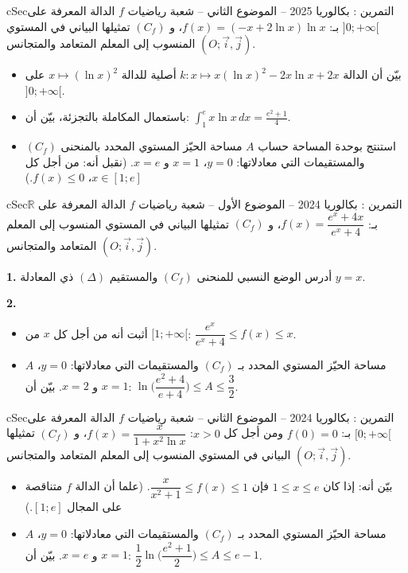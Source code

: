 \documentclass[12pt,a4paper]{article}
\newenvironment{BOX}[2]{\begin{otherlanguage}{english}\begin{arbox}{#1}{#2}}{\end{arbox}\end{otherlanguage}}
\newcounter{exo}
\newenvironment{tamrin}[1]{\stepcounter{exo}\begin{BOX}{cSec}{التمرين \theexo: #1}}{\end{BOX}}
\newcommand{\R}{\mathbb{R}}
\newenvironment{sq}{\begin{itemize}[leftmargin=2.4em,itemsep=3pt]}{\end{itemize}}
\newcommand{\qa}{\item[(أ)]}\newcommand{\qb}{\item[(ب)]}\newcommand{\qc}{\item[(جـ)]}\newcommand{\qd}{\item[(د)]}\newcommand{\qe}{\item[(هـ)]}
\newcommand{\QQ}[1]{\par\smallskip\textbf{#1.} }
\begin{document}
\begin{tamrin}{بكالوريا 2025 -- الموضوع الثاني -- شعبة رياضيات}
$f$ الدالة المعرفة على $]0;+\infty[$ بـ: $f(x)=(-x+2\ln x)\ln x$، و $(C_f)$ تمثيلها البياني في المستوي المنسوب إلى المعلم المتعامد والمتجانس $(O;\vec i,\vec j)$.
\begin{sq}
\qa بيّن أن الدالة $k:x\mapsto x(\ln x)^2-2x\ln x+2x$ أصلية للدالة $x\mapsto(\ln x)^2$ على $]0;+\infty[$.
\qb باستعمال المكاملة بالتجزئة، بيّن أن: $\displaystyle\int_1^ex\ln x\,dx=\frac{e^2+1}{4}$.
\qc استنتج بوحدة المساحة حساب $A$ مساحة الحيّز المستوي المحدد بالمنحنى $(C_f)$ والمستقيمات التي معادلاتها: $y=0$، $x=1$ و $x=e$. (نقبل أنه: من أجل كل $x\in[1;e]$، $f(x)\le0$.)
\end{sq}
\end{tamrin}

\begin{tamrin}{بكالوريا 2024 -- الموضوع الأول -- شعبة رياضيات}
$f$ الدالة المعرفة على $\R$ بـ: $f(x)=\dfrac{e^x+4x}{e^x+4}$، و $(C_f)$ تمثيلها البياني في المستوي المنسوب إلى المعلم المتعامد والمتجانس $(O;\vec i,\vec j)$.
\QQ{1} أدرس الوضع النسبي للمنحنى $(C_f)$ والمستقيم $(\Delta)$ ذي المعادلة $y=x$.
\QQ{2}
\begin{sq}
\qa أثبت أنه من أجل كل $x$ من $[1;+\infty[$: $\dfrac{e^x}{e^x+4}\le f(x)\le x$.
\qb $A$ مساحة الحيّز المستوي المحدد بـ $(C_f)$ والمستقيمات التي معادلاتها: $y=0$، $x=1$ و $x=2$. بيّن أن: $\ln\Big(\dfrac{e^2+4}{e+4}\Big)\le A\le\dfrac32$.
\end{sq}
\end{tamrin}

\begin{tamrin}{بكالوريا 2024 -- الموضوع الثاني -- شعبة رياضيات}
$f$ الدالة المعرفة على $[0;+\infty[$ بـ: $f(0)=0$ ومن أجل كل $x>0$: $f(x)=\dfrac{x}{1+x^2\ln x}$، و $(C_f)$ تمثيلها البياني في المستوي المنسوب إلى المعلم المتعامد والمتجانس $(O;\vec i,\vec j)$.
\begin{sq}
\qa بيّن أنه: إذا كان $1\le x\le e$ فإن $\dfrac{x}{x^2+1}\le f(x)\le1$. (علما أن الدالة $f$ متناقصة على المجال $[1;e]$.)
\qb $A$ مساحة الحيّز المستوي المحدد بـ $(C_f)$ والمستقيمات التي معادلاتها: $y=0$، $x=1$ و $x=e$. بيّن أن: $\dfrac12\ln\Big(\dfrac{e^2+1}{2}\Big)\le A\le e-1$.
\end{sq}
\end{tamrin}
\end{document}
